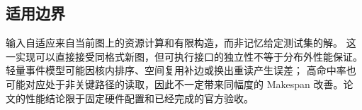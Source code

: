 \subsection{适用边界}
输入自适应来自当前图上的资源计算和有限构造，而非记忆给定测试集的解。
这一实现可以直接接受同格式新图，但可执行接口的独立性不等于分布外性能保证。
轻量事件模型可能因核内排序、空间复用补边或换出重读产生误差；
高命中率也可能对应处于非关键路径的读取，因此不一定带来同幅度的
Makespan 改善。论文的性能结论限于固定硬件配置和已经完成的官方验收。
